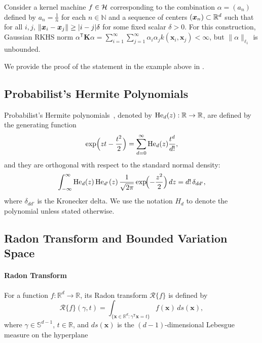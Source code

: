 \begin{example}\label{exam: divergence}
Consider a kernel machine $f \in {\mathcal{H}}$ corresponding to the combination $\alpha = (a_n)$ defined by $a_n = \frac{1}{n}$ for each $n \in \mathbb{N}$ and a sequence of centers $(\bm{x}_n) \subset \mathbb{R}^d$ such that for all $i,j$, $\left\|\bm{x}_i - \bm{x}_j\right\| \ge |i-j| \delta$ for some fixed scalar $\delta > 0$. For this construction, Gaussian RKHS norm $\alpha^{\mathsf{T}} \mathbf{K} \alpha = \sum_{i = 1}^\infty\sum_{j = 1}^\infty \alpha_i\alpha_j k(\bm{x}_i,\bm{x}_j) < \infty$, but $\|\alpha\|_{\ell_1}$ is unbounded. 
\end{example}
We provide the proof of the statement in the example above in \iftoggle{longversion}{\appref{app: diverging}}{the supplemental materials}.

\subsection{Probabilist's Hermite Polynomials}
Probabilist's Hermite polynomials~\citep{szegő1975orthogonal}, denoted by \( \text{He}_d(z) : \mathbb{R} \to \mathbb{R} \), are defined by the generating function
\[
\exp\Bigl(zt-\frac{t^2}{2}\Bigr)=\sum_{d=0}^\infty \text{He}_d(z)\frac{t^d}{d!},
\]
and they are orthogonal with respect to the standard normal density:
\[
\int_{-\infty}^{\infty} \text{He}_d(z)\, \text{He}_{d'}(z)\, \frac{1}{\sqrt{2\pi}} \exp\!\Bigl(-\frac{z^2}{2}\Bigr)\,dz = d!\,\delta_{dd'},
\]
where \(\delta_{dd'}\) is the Kronecker delta. We use the notation $H_d$ to denote the polynomial unless stated otherwise.

\subsection{Radon Transform and Bounded Variation Space}

\paragraph{Radon Transform} For a function \(f : \mathbb{R}^d \to \mathbb{R}\), its Radon transform 
\(\mathcal{R}\{f\}\) is defined by
\[
  \mathcal{R}\{f\}(\gamma, t)
  = \int_{\{ \bm{x} \in \mathbb{R}^d : \gamma^{\mathsf{T}} \bm{x} = t \}} 
    f(\bm{x})\,ds(\bm{x}),
\]
where \(\gamma \in \mathbb{S}^{d-1}\), \(t \in \mathbb{R}\), and \(ds(\bm{x})\) is the 
\((d-1)\)-dimensional Lebesgue measure on the hyperplane 


